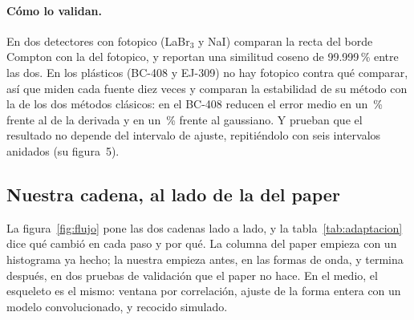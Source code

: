\documentclass[11pt,a4paper]{article}
\begin{document}
\paragraph{Cómo lo validan.} En dos detectores con fotopico (LaBr$_3$ y NaI)
comparan la recta del borde Compton con la del fotopico, y reportan una
similitud coseno de 99.999\,\% entre las dos. En los plásticos (BC-408 y
EJ-309) no hay fotopico contra qué comparar, así que miden cada fuente diez
veces y comparan la estabilidad de su método con la de los dos métodos
clásicos: en el BC-408 reducen el error medio en un \ReduccionDif\,\% frente
al de la derivada y en un \ReduccionGauss\,\% frente al gaussiano. Y
prueban que el resultado no depende del intervalo de ajuste, repitiéndolo con
seis intervalos anidados (su figura~5).

\subsection{Nuestra cadena, al lado de la del paper}
\label{sec:adaptacion}

La figura~\ref{fig:flujo} pone las dos cadenas lado a lado, y la
tabla~\ref{tab:adaptacion} dice qué cambió en cada paso y por qué. La
columna del paper empieza con un histograma ya hecho; la nuestra empieza
antes, en las formas de onda, y termina después, en dos pruebas de validación
que el paper no hace. En el medio, el esqueleto es el mismo: ventana por
correlación, ajuste de la forma entera con un modelo convolucionado, y
recocido simulado.


\end{document}
